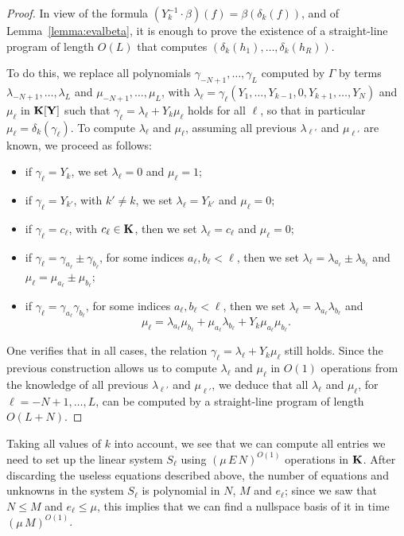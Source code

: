 \documentclass[12pt]{article}
\begin{document}
\begin{proof}
  In view of the formula $(Y_k^{-1} \cdot
  \beta)(f)=\beta(\delta_k(f))$, and of Lemma~\ref{lemma:evalbeta}, it is
  enough to prove the existence of a straight-line program of length
  $O(L)$ that computes $(\delta_k(h_1),\dots,\delta_k(h_R))$.

  To do this, we replace all polynomials
  $\gamma_{-N+1},\dots,\gamma_L$ computed by $\Gamma$ by terms
  $\lambda_{-N+1},\dots,\lambda_L$ and $\mu_{-N+1},\dots,\mu_L$, with
  $\lambda_\ell=\gamma_\ell(Y_1,\dots,Y_{k-1},0,Y_{k+1},\dots,Y_N)$
  and $\mu_\ell$ in $\mathbf{K}[\mathbf{Y}]$ such that $\gamma_\ell= \lambda_\ell+Y_k
  \mu_\ell$ holds for all $\ell$, so that in particular
  $\mu_\ell=\delta_k(\gamma_\ell)$.  To compute $\lambda_\ell$ and
  $\mu_\ell$, assuming all previous $\lambda_{\ell'}$ and
  $\mu_{\ell'}$ are known, we proceed as follows:
  \begin{itemize}
  \item if $\gamma_\ell=Y_k$, we set $\lambda_\ell=0$ and $\mu_\ell=1$;
  \item if $\gamma_\ell=Y_{k'}$, with $k' \ne k$, we set $\lambda_\ell=Y_{k'}$ and $\mu_\ell=0$;
  \item if $\gamma_\ell =c_\ell$, with $c_\ell \in \mathbf{K}$,
    then we set $\lambda_\ell=c_\ell$ and  $\mu_\ell=0$;
  \item if $\gamma_\ell = \gamma_{a_\ell} \pm \gamma_{b_\ell}$,
    for some indices $a_\ell,b_\ell < \ell$, 
    then we set $\lambda_\ell=\lambda_{a_\ell}\pm\lambda_{b_\ell}$
    and $\mu_\ell=\mu_{a_\ell}\pm\mu_{b_\ell}$;
\item if $\gamma_\ell = \gamma_{a_\ell} \gamma_{b_\ell}$,
      for some indices $a_\ell,b_\ell < \ell$,
    then we set $\lambda_\ell=\lambda_{a_\ell} \lambda_{b_\ell}$
    and $$\mu_\ell=
\lambda_{a_\ell} \mu_{b_\ell}
+
\mu_{a_\ell} \lambda_{b_\ell}
+
Y_k\mu_{a_\ell} \mu_{b_\ell}.$$
\end{itemize}
One verifies that in all cases, the relation $\gamma_\ell=
\lambda_\ell+Y_k \mu_\ell$ still holds. Since the previous
construction allows us to compute $\lambda_\ell$ and $\mu_\ell$ in
$O(1)$ operations from the knowledge of all previous $\lambda_{\ell'}$
and $\mu_{\ell'}$, we deduce that all $\lambda_\ell$ and $\mu_\ell$,
for $\ell=-N+1,\dots,L$, can be computed by a straight-line program of
length $O(L+N)$.
\end{proof}

Taking all values of $k$ into account, we see that we can compute all
entries we need to set up the linear system $S_\ell$ using
$(\mu\,E\,N)^{O(1)}$ operations in $\mathbf{K}$. After discarding the useless
equations described above, the number of equations and unknowns in the
system $S_\ell$ is polynomial in $N$, $M$ and $e_\ell$; since we saw
that $N \le M$ and $e_\ell \le \mu$, this implies that we can find a
nullspace basis of it in time $(\mu\,M)^{O(1)}$. 
\end{document}

